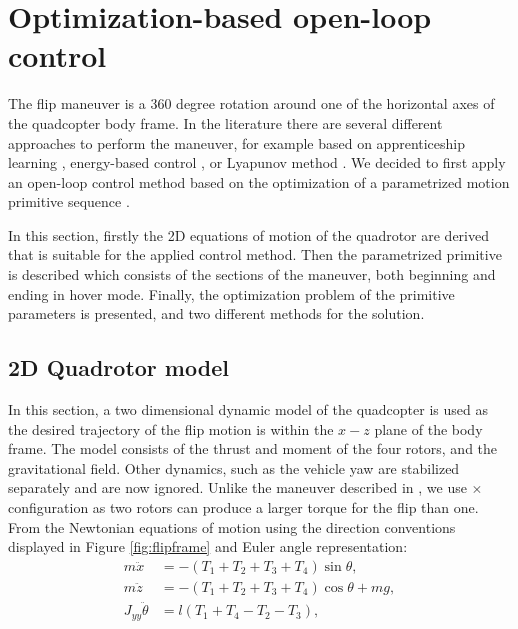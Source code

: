 \section{Optimization-based open-loop control}\label{sec:flip}
The flip maneuver is a 360 degree rotation around one of the horizontal axes of the quadcopter body frame. In the literature there are several different approaches to perform the maneuver, for example based on apprenticeship learning \cite{abbeel2010}, energy-based control \cite{energy-quaternion}, or Lyapunov method \cite{lyapunov-flip}. We decided to first apply an  open-loop control method based on the optimization of a parametrized motion primitive sequence \cite{LSICRA2010}.

In this section, firstly the 2D equations of motion of the quadrotor are derived that is suitable for the applied control method. Then the parametrized primitive is described which consists of the sections of the maneuver, both beginning and ending in hover mode. Finally, the optimization problem of the primitive parameters is presented, and two different methods for the solution. 

\subsection{2D Quadrotor model}

In this section, a two dimensional dynamic model of the quadcopter is used as the desired trajectory of the flip motion is within the $x-z$ plane of the body frame. The model consists of the thrust and moment of the four rotors, and the gravitational field. Other dynamics, such as the vehicle yaw are stabilized separately and are now ignored. Unlike the maneuver described in \cite{LSICRA2010}, we use $\times$ configuration as two rotors can produce a larger torque for the flip than one. From the Newtonian equations of motion using the direction conventions displayed in Figure \ref{fig:flipframe} and Euler angle representation:
\begin{align}
m\ddot{x}&=-(T_1 + T_2 + T_3 + T_4)\sin\theta,\\
m\ddot{z}&=-(T_1 + T_2 +T_3 + T_4) \cos\theta+mg,\\
J_{yy}\ddot{\theta} &= l(T_1+T_4-T_2-T_3),\label{eq:opinp1}
\end{align}

